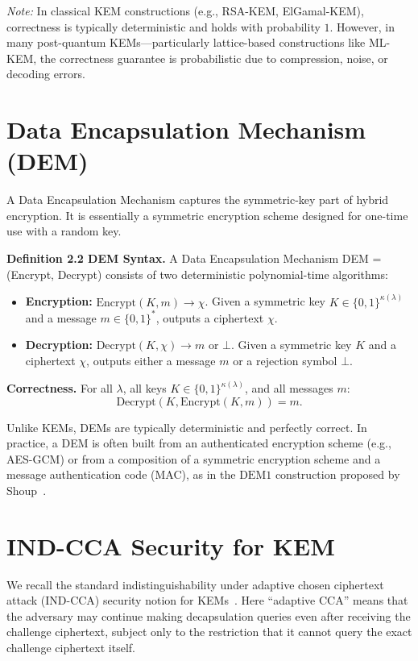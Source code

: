 \textit{Note:} In classical KEM constructions (e.g., RSA-KEM, ElGamal-KEM), correctness is typically deterministic and holds with probability $1$. However, in many post-quantum KEMs—particularly lattice-based constructions like ML-KEM, the correctness guarantee is probabilistic due to compression, noise, or decoding errors.

\section{Data Encapsulation Mechanism (DEM)}

A Data Encapsulation Mechanism captures the symmetric-key part of hybrid encryption. It is essentially a symmetric encryption scheme designed for one-time use with a random key.


\noindent\textbf{Definition 2.2 DEM Syntax.} A Data Encapsulation Mechanism DEM = (Encrypt, Decrypt) consists of two deterministic polynomial-time algorithms:
\begin{itemize}
    \item \textbf{Encryption:} $\text{Encrypt}(K, m) \to \chi$. Given a symmetric key $K \in \{0,1\}^{\kappa(\lambda)}$ and a message $m \in \{0,1\}^*$, outputs a ciphertext $\chi$.
    \item \textbf{Decryption:} $\text{Decrypt}(K, \chi) \to m \text{ or } \bot$. Given a symmetric key $K$ and a ciphertext $\chi$, outputs either a message $m$ or a rejection symbol $\bot$.
\end{itemize}

\noindent\textbf{Correctness.} For all $\lambda$, all keys $K \in \{0,1\}^{\kappa(\lambda)}$, and all messages $m$:
$$
\text{Decrypt}(K, \text{Encrypt}(K, m)) = m.
$$

Unlike KEMs, DEMs are typically deterministic and perfectly correct. In practice, a DEM is often built from an authenticated encryption scheme (e.g., AES-GCM) or from a composition of a symmetric encryption scheme and a message authentication code (MAC), as in the $\text{DEM1}$ construction proposed by Shoup~\cite{shoup2001proposal}.

\section{IND-CCA Security for KEM}

We recall the standard indistinguishability under adaptive chosen ciphertext attack (IND-CCA) security notion for KEMs~\cite{shoup2001proposal}. Here ``adaptive CCA'' means that the adversary may continue making decapsulation queries even after receiving the challenge ciphertext, subject only to the restriction that it cannot query the exact challenge ciphertext itself.

